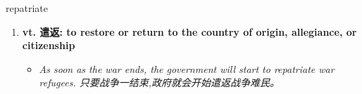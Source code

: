 
\begin{frame}
{\huge repatriate}
\begin{center}
\begin{enumerate}\Large
  \item \textbf{vt. 遣返: to restore or return to the country of origin, allegiance, or citizenship}
  \begin{itemize}
    \item \em{\Large{As soon as the war ends, the government will start to repatriate war refugees. 只要战争一结束,政府就会开始遣返战争难民。}}
  \end{itemize}
\end{enumerate}
\end{center}
\end{frame}
